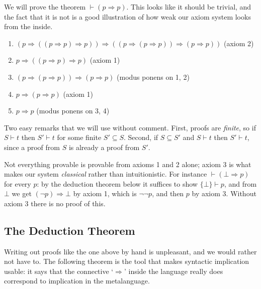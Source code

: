\documentclass[a4paper]{scrartcl}
\begin{document}
\begin{example}
  We will prove the theorem $\vdash (p \Rightarrow p)$. This looks like it should be trivial, and the fact that it is not is a good illustration of how weak our axiom system looks from the inside.
  \begin{enumerate}
    \item $(p \Rightarrow((p \Rightarrow p) \Rightarrow p)) \Rightarrow((p \Rightarrow(p \Rightarrow p)) \Rightarrow(p \Rightarrow p))$ \hfill (axiom 2)
    \item $p \Rightarrow((p \Rightarrow p) \Rightarrow p)$ \hfill (axiom 1)
    \item $(p \Rightarrow(p \Rightarrow p)) \Rightarrow(p \Rightarrow p)$ \hfill (modus ponens on 1, 2)
    \item $p \Rightarrow(p \Rightarrow p)$ \hfill (axiom 1)
    \item $p \Rightarrow p$ \hfill (modus ponens on 3, 4)
  \end{enumerate}
\end{example}

Two easy remarks that we will use without comment. First, proofs are \emph{finite}, so if $S \vdash t$ then $S' \vdash t$ for some finite $S' \subseteq S$. Second, if $S \subseteq S'$ and $S \vdash t$ then $S' \vdash t$, since a proof from $S$ is already a proof from $S'$.

\begin{example}
  Not everything provable is provable from axioms 1 and 2 alone; axiom 3 is what makes our system \emph{classical} rather than intuitionistic. For instance $\vdash (\bot \Rightarrow p)$ for every $p$: by the deduction theorem below it suffices to show $\{\bot\} \vdash p$, and from $\bot$ we get $(\lnot p) \Rightarrow \bot$ by axiom 1, which is $\lnot\lnot p$, and then $p$ by axiom 3. Without axiom 3 there is no proof of this.
\end{example}

\subsection{The Deduction Theorem}

Writing out proofs like the one above by hand is unpleasant, and we would rather not have to. The following theorem is the tool that makes syntactic implication usable: it says that the connective `$\Rightarrow$' inside the language really does correspond to implication in the metalanguage.
\end{document}
